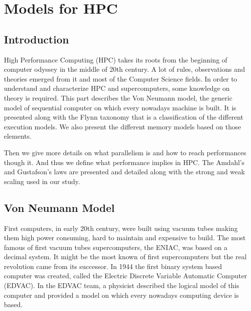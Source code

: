 
\chapter{Models for HPC}

\section{Introduction}

High Performance Computing (HPC) takes its roots from the beginning of computer odyssey in the middle of 20th century.
A lot of rules, observations and theories emerged from it and most of the Computer Science fields. 
In order to understand and characterize HPC and supercomputers, some knowledge on theory is required. 
This part describes the Von Neumann model, the generic model of sequential computer on which every nowadays machine is built.
It is presented along with the Flynn taxonomy that is a classification of the different execution models. 
We also present the different memory models based on those elements. 

Then we give more details on what parallelism is and how to reach performances though it. 
And thus we define what performance implies in HPC. 
The Amdahl's and Gustafson's laws are presented and detailed along with the strong and weak scaling used in our study. 

\section{Von Neumann Model}
First computers, in early 20th century, were built using vacuum tubes making them high power consuming, hard to maintain and expensive to build.
The most famous of first vacuum tubes supercomputers, the ENIAC, was based on a decimal system.
It might be the most known of first supercomputers but the real revolution came from its successor.
In 1944 the first binary system based computer was created, called the Electric Discrete Variable Automatic Computer (EDVAC). 
In the EDVAC team, a physicist described the logical model of this computer and provided a model on which every nowadays computing device is based. 

